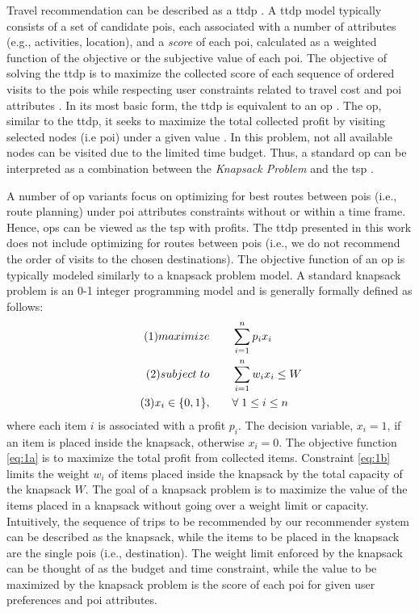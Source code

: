 Travel recommendation can be described as a \gls{ttdp} \parencite{Vansteenwegen2007TheOpportunity}. A \gls{ttdp} model typically consists of a set of candidate \glspl{poi}, each associated with a number of attributes (e.g., activities, location), and a \textit{score} of each \gls{poi}, calculated as a weighted function of the objective or the subjective value of each \gls{poi}. The objective of solving the \gls{ttdp} is to maximize the collected score of each sequence of ordered visits to the \glspl{poi} while respecting user constraints related to travel cost and \gls{poi} attributes \parencite{Survey_TTDP_Guavalas}. In its most basic form, the \gls{ttdp} is equivalent to an \gls{op} \parencite{Vansteenwegen2007TheOpportunity}. The \gls{op}, similar to the \gls{ttdp}, it seeks to maximize the total collected profit by visiting selected nodes (i.e \gls{poi}) under a given value \parencite{T.1984HeuristicOrienteering}. In this problem, not all available nodes can be visited due to the limited time budget. Thus, a standard \gls{op} can be interpreted as a combination between the \textit{Knapsack Problem} and the \gls{tsp} \parencite{OP_Solution_Gunawan}. 

A number of \gls{op} variants focus on optimizing for best routes between \glspl{poi} (i.e., route planning) under \gls{poi} attributes constraints without or within a time frame. Hence, \glspl{op} can be viewed as the \gls{tsp} with profits. The \gls{ttdp} presented in this work does not include optimizing for routes between \glspl{poi} (i.e., we do not recommend the order of visits to the chosen destinations). The objective function of an \gls{op} is typically modeled similarly to a knapsack problem model. A standard knapsack problem is an 0-1 integer programming model and is generally formally defined as follows:
\begin{align}\tag{1}
    maximize \qquad &\sum_{i=1}^n p_ix_i\label{eq:1a}\\
   \tag{2} subject \hspace{0.1cm} to \qquad &\sum_{i=1}^n w_ix_i \leq W\label{eq:1b} \\
    \tag{3}x_i \in \{0,1\}, \qquad &\forall \hspace{0.1cm} 1 \leq i \leq n\label{eq:1c}
\end{align}
where each item $i$ is associated with a profit $p_i$. The decision variable, $x_i = 1$, if an item is placed inside the knapsack, otherwise $x_i=0$. The objective function \ref{eq:1a} is to maximize the total profit from collected items. Constraint \ref{eq:1b} limits the weight $w_i$ of items placed inside the knapsack by the total capacity of the knapsack $W$. The goal of a knapsack problem is to maximize the value of the items placed in a knapsack without going over a weight limit or capacity. Intuitively, the sequence of trips to be recommended by our recommender system can be described as the knapsack, while the items to be placed in the knapsack are the single \glspl{poi} (i.e., destination). The weight limit enforced by the knapsack can be thought of as the budget and time constraint, while the value to be maximized by the knapsack problem is the score of each \gls{poi} for given user preferences and \gls{poi} attributes.

